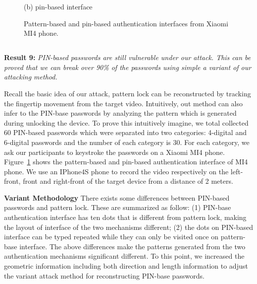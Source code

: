\begin{figure}[!t]
{\begin{minipage}[t]{0.18\textwidth}
                \centering \footnotesize (b) pin-based interface
                \end{minipage}
            }
            \caption{Pattern-based and pin-based authentication interfaces from Xiaomi MI4 phone.}
            \label{fig:unlock interface}
        \end{figure}

    \subsection{}
        \noindent \textbf{Result 9:} \emph{PIN-based passwords are still vulnerable under our attack. This can be proved that we can break over {\color{red}90\%} of the passwords using simple a variant of our attacking method.}
        
        Recall the basic idea of our attack, pattern lock can be reconstructed by tracking the fingertip movement  from the target video. Intuitively, out method can also infer to the PIN-base passwords by analyzing the pattern which is generated during unlocking the device. To prove this intuitively imagine, we total collected 60 PIN-based passwords which were separated into two categories: 4-digital and 6-digital passwords and the number of each category is 30. For each category, we ask our participants to keystroke the passwords on a Xiaomi MI4 phone. Figure~\ref{fig:unlock interface} shows the pattern-based and pin-based authentication interface of MI4 phone.  We use an IPhone4S phone to record the video respectively on the left-front, front and right-front of the target device from a distance of 2 meters.
        
        \noindent \textbf{Variant Methodology} There exists some differences between PIN-based passwords and pattern lock. These are summarized as follow: (1) PIN-base authentication interface has ten dots that is different from pattern lock, making the layout of interface of the two mechanisms different; (2) the dots on PIN-based interface can be typed repeated while they can only be visited once on pattern-base interface. The above differences make the patterns generated from the two authentication mechanisms significant different.  To this point, we increased the geometric information including both direction and length information to adjust the variant attack method for reconstructing PIN-base passwords.
        
        
        
    
